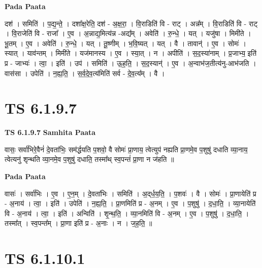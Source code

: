 \documentclass[17pt]{extarticle}
\begin{document}
\textbf{Pada Paata} \newline

दश॑ । समिति॑ । प॒द्य॒न्ते॒ । दशा᳚क्ष॒रेति॒ दश॑ - अ॒क्ष॒रा॒ । वि॒राडिति॑ वि - राट् । अन्न᳚म् । वि॒राडिति॑ वि - राट् । वि॒राजेति॑ वि - राजा᳚ । ए॒व । अ॒न्नाद्य॒मित्य॑न्न -अद्य᳚म् । अवेति॑ । रु॒न्धे॒ । यत् । यजु॑षा । मिमी॑ते । भू॒तम् । ए॒व । अवेति॑ । रु॒न्धे॒ । यत् । तू॒ष्णीम् । भ॒वि॒ष्यत् । यत् । वै । तावान्॑ । ए॒व । सोमः॑ । स्यात् । याव॑न्तम् । मिमी॑ते । यज॑मानस्य । ए॒व । स्या॒त् । न । अपीति॑ । स॒द॒स्या॑नाम् । प्र॒जाभ्य॒ इति॑ प्र - जाभ्यः॑ । त्वा॒ । इति॑ । उप॑ । समिति॑ । ऊ॒ह॒ति॒ । स॒द॒स्यान्॑ । ए॒व । अ॒न्वाभ॑ज॒तीत्य॑नु-आभ॑जति । वास॑सा । उपेति॑ । न॒ह्य॒ति॒ । स॒र्व॒दे॒व॒त्य॑मिति॑ सर्व - दे॒व॒त्य᳚म् । वै ।  \newline




\section*{ TS 6.1.9.7 }

\textbf{TS 6.1.9.7 } \newline
\textbf{Samhita Paata} \newline

वासः॒ सर्वा॑भिरे॒वैनं॑ दे॒वता॑भिः॒ सम॑र्द्धयति प॒शवो॒ वै सोमः॑ प्रा॒णाय॒ त्वेत्युप॑ नह्यति प्रा॒णमे॒व प॒शुषु॑ दधाति व्या॒नाय॒ त्वेत्यनु॑ शृन्थति व्या॒नमे॒व प॒शुषु॑ दधाति॒ तस्मा᳚थ् स्व॒पन्तं॑ प्रा॒णा न ज॑हति ॥ \newline

\textbf{Pada Paata} \newline

वासः॑ । सर्वा॑भिः । ए॒व । ए॒न॒म् । दे॒वता॑भिः । समिति॑ । अ॒द्‌र्ध॒य॒ति॒ । प॒शवः॑ । वै । सोमः॑ । प्रा॒णायेति॑ प्र - अ॒नाय॑ । त्वा॒ । इति॑ । उपेति॑ । न॒ह्य॒ति॒ । प्रा॒णमिति॑ प्र - अ॒नम् । ए॒व । प॒शुषु॑ । द॒धा॒ति॒ । व्या॒नायेति॑ वि - अ॒नाय॑ । त्वा॒ । इति॑ । अन्विति॑ । शृ॒न्थ॒ति॒ । व्या॒नमिति॑ वि - अ॒नम् । ए॒व । प॒शुषु॑ । द॒धा॒ति॒ । तस्मा᳚त् । स्व॒पन्त᳚म् । प्रा॒णा इति॑ प्र - अ॒नाः । न । ज॒ह॒ति॒ ॥  \newline




\section*{ TS 6.1.10.1 }
\end{document}
